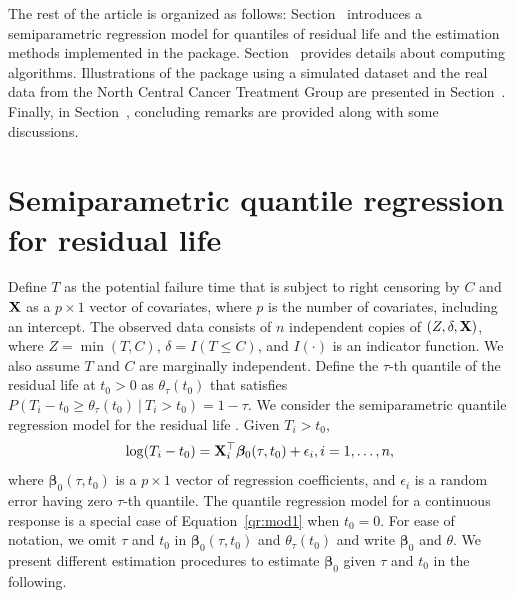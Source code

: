 The rest of the article is organized as follows: Section~ introduces 
a semiparametric regression model for quantiles of residual life and the estimation methods 
implemented in the package. 
Section~ provides details about computing algorithms. 
Illustrations of the package using a simulated dataset and the real data from the
North Central Cancer Treatment Group 
are presented in Section~. 
Finally, in Section~, concluding remarks are provided along with some discussions.

\section{Semiparametric quantile regression for residual life}
\label{sec:nsm}

Define $T$ as the potential failure time that is subject to right censoring by $C$
and $\mathbf{X}$ as a $p \times 1$ vector of covariates, 
where $p$ is the number of covariates, including an intercept.
The observed data consists of 
$n$ independent copies of $(Z, \delta, \mathbf{X})$, where $Z = \min(T, C)$, 
$\delta = I(T \leq C)$, %
and $I(\cdot)$ is an indicator function. 
We also assume $T$ and $C$ are marginally independent. 
Define the $\tau$-th quantile of the residual life at $t_0 > 0$ as
$\theta_{\tau}(t_0)$ that satisfies $P(T_i - t_0 \geq \theta_{\tau}(t_0) \ | \ T_i > t_0) = 1 - \tau$.
We consider the semiparametric quantile regression model for the residual life \citep{kim2012censored, kim2023smoothed}. Given $T_i > t_0$,
\begin{equation} \label{qr:mod1}
  \log(T_i - t_0) = \vect{X}_{i}^{\top}\bm{\beta}_0(\tau, t_0) + \epsilon_i, i = 1, \ldots, n, %
\end{equation}
where $\bm{\beta}_0(\tau, t_0)$ is a $p \times 1$ vector of regression coefficients, 
and $\epsilon_i$ is a random error having zero $\tau$-th quantile. 
The quantile regression model for a continuous response \citep{koenker1978regression} 
is a special case of Equation~\eqref{qr:mod1} when $t_0 = 0$. 
For ease of notation, we omit $\tau$ and $t_0$ in $\bm{\beta}_0(\tau, t_0)$ and $\theta_{\tau}(t_0)$ 
and write $\bm{\beta}_0$ and $\theta$. 
We present different estimation procedures to estimate $\bm{\beta}_0$ given $\tau$ and $t_0$ in the following.


